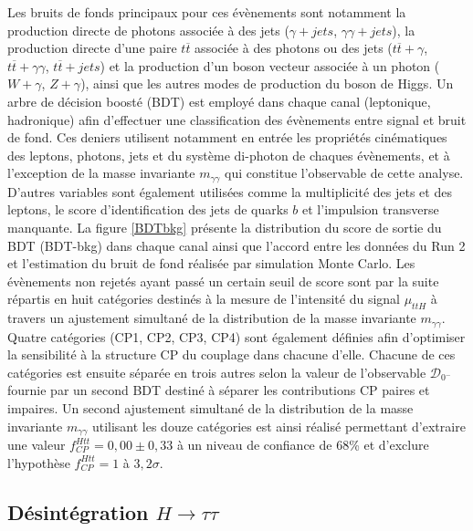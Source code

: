     Les bruits de fonds principaux pour ces évènements sont notamment la production directe de photons associée à des jets ($\gamma+jets$, $\gamma\gamma+jets$), la production directe d'une paire $t\overline{t}$ associée à des photons ou des jets ($t\overline{t}+\gamma$, $t\overline{t}+\gamma\gamma$, $t\overline{t}+jets$) et la production d'un boson vecteur associée à un photon ($W+\gamma$, $Z+\gamma$), ainsi que les autres modes de production du boson de Higgs. Un arbre de décision boosté (BDT) est employé dans chaque canal (leptonique, hadronique) afin d'effectuer une classification des évènements entre signal et bruit de fond. Ces deniers utilisent notamment en entrée les propriétés cinématiques des leptons, photons, jets et du système di-photon de chaques évènements, et à l'exception de la masse invariante $m_{\gamma\gamma}$ qui constitue l'observable de cette analyse. D'autres variables sont également utilisées comme la multiplicité des jets et des leptons, le score d'identification des jets de quarks $b$ et l'impulsion transverse manquante. La figure \ref{BDTbkg} présente la distribution du score de sortie du BDT (BDT-bkg) dans chaque canal ainsi que l'accord entre les données du Run 2 et l'estimation du bruit de fond réalisée par simulation Monte Carlo. Les évènements non rejetés ayant passé un certain seuil de score sont par la suite répartis en huit catégories destinés à la mesure de l'intensité du signal $\mu_{ttH}$ à travers un ajustement simultané de la distribution de la masse invariante $m_{\gamma\gamma}$. Quatre catégories (CP1, CP2, CP3, CP4) sont également définies afin d'optimiser la sensibilité à la structure CP du couplage dans chacune d'elle. Chacune de ces catégories est ensuite séparée en trois autres selon la valeur de l'observable $\mathcal{D}_{0^-}$ fournie par un second BDT destiné à séparer les contributions CP paires et impaires. Un second ajustement simultané de la distribution de la masse invariante $m_{\gamma\gamma}$ utilisant les douze catégories est ainsi réalisé permettant d'extraire une valeur $f_{CP}^{Htt}=0,00\pm0,33$ à un niveau de confiance de $68$\% et d'exclure l'hypothèse $f_{CP}^{Htt}=1$ à $3,2\sigma$.


    \subsection{Désintégration $H\rightarrow\tau\tau$}
    \label{Htautau}
    
